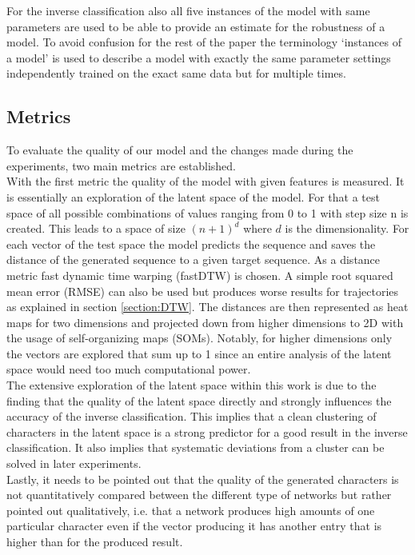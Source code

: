 	
	For the inverse classification also all five instances of the model with same parameters are used to be able to provide an estimate for the robustness of a model. To avoid confusion for the rest of the paper the terminology `instances of a model' is used to describe a model with exactly the same parameter settings independently trained on the exact same data but for multiple times.

\subsection{Metrics}
	To evaluate the quality of our model and the changes made during the experiments, two main metrics are established. \\
	With the first metric the quality of the model with given features is measured. It is essentially an exploration of the latent space of the model. For that a test space of all possible combinations of values ranging from 0 to 1 with step size n is created. This leads to a space of size $(n+1)^d$ where $d$ is the dimensionality. For each vector of the test space the model predicts the sequence and saves the distance of the generated sequence to a given target sequence. As a distance metric fast dynamic time warping (fastDTW) is chosen. A simple root squared mean error (RMSE) can also be used but produces worse results for trajectories as explained in section \ref{section:DTW}. The distances are then represented as heat maps for two dimensions and projected down from higher dimensions to 2D with the usage of self-organizing maps (SOMs). Notably, for higher dimensions only the vectors are explored that sum up to 1 since an entire analysis of the latent space would need too much computational power.\\
	The extensive exploration of the latent space within this work is due to the finding that the quality of the latent space directly and strongly influences the accuracy of the inverse classification. This implies that a clean clustering of characters in the latent space is a strong predictor for a good result in the inverse classification. It also implies that systematic deviations from a cluster can be solved in later experiments.\\
	Lastly, it needs to be pointed out that the quality of the generated characters is not quantitatively compared between the different type of networks but rather pointed out qualitatively, i.e. that a network produces high amounts of one particular character even if the vector producing it has another entry that is higher than for the produced result. \\
